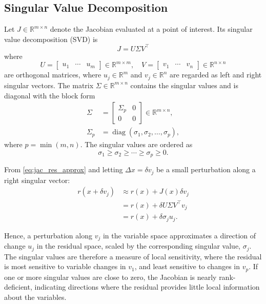 \subsection{Singular Value Decomposition}

Let $J \in \mathbb{R}^{m \times n}$ denote the Jacobian evaluated at a point of interest. Its singular value decomposition (SVD) \cite[pp.~41-42]{bjork2008} is
\begin{equation*}
J = U \Sigma V^\top
\end{equation*}
where
\begin{equation*}
U =
\begin{bmatrix}
    u_1 & \cdots & u_m
\end{bmatrix}
\in \mathbb{R}^{m \times m},
\quad
V =
\begin{bmatrix}
    v_1 & \cdots & v_n
\end{bmatrix}
\in \mathbb{R}^{n \times n}
\end{equation*}
are orthogonal matrices, where $u_j \in \mathbb{R}^m$ and $v_j \in \mathbb{R}^n$ are regarded as left and right singular vectors. The matrix \(\Sigma \in \mathbb{R}^{m \times n}\) contains the singular values and is diagonal with the block form
\begin{align*}
    \Sigma &=
    \begin{bmatrix}
        \Sigma_p & 0\\
        0 & 0
    \end{bmatrix}
    \in \mathbb{R}^{m\times n},\\
    \Sigma_p &= \operatorname{diag}(\sigma_1,\sigma_2,\dots,\sigma_p),
\end{align*}
where \(p=\min(m,n)\). The singular values are ordered as
\begin{equation*}
\sigma_1 \ge \sigma_2 \ge \cdots \ge \sigma_p \ge 0.
\end{equation*}

From \cref{eq:jac_res_approx} and letting $\Delta x=\delta v_j$ be a small perturbation along a right singular vector:
\begin{align*}
    r(x+\delta v_j) & \approx r(x) + J(x)\delta v_j\\
    & = r(x) + \delta U \Sigma V^\top v_j \\
    & = r(x) + \delta \sigma_ju_j.
\end{align*}

Hence, a perturbation along $v_j$ in the variable space approximates a direction of change $u_j$ in the residual space, scaled by the corresponding singular value, $\sigma_j$. The singular values are therefore a measure of local sensitivity, where the residual is most sensitive to variable changes in $v_1$, and least sensitive to changes in $v_p$. If one or more singular values are close to zero, the Jacobian is nearly rank-deficient, indicating directions where the residual provides little local information about the variables.

